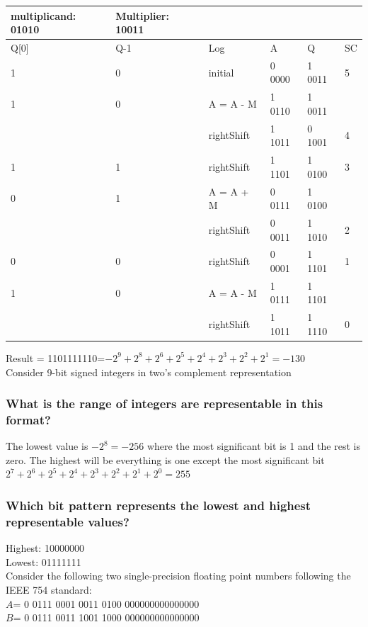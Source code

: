 \documentclass[12pt, a4paper]{article}
\begin{document}
				\begin{table}[h!]
				\begin{tabular}{|l|l|l|l|l|l|}
				multiplicand: 01010 & Multiplier: 10011 \\
				\hline
				Q[0] & Q-1 & Log & A & Q & SC\\
				\hline
				1 & 0 & initial & 0 0000  & 1 0011  & 5\\
				\hline
				1 & 0 & A = A - M &1 0110  & 1 0011 &\\
				\hline
				& &  rightShift & 1 1011  & 0 1001  & 4\\
				\hline
				1 & 1 &  rightShift & 1 1101  & 1 0100  & 3\\
				\hline
				0 & 1 & A = A + M & 0 0111  & 1 0100 &\\
				\hline
				& &  rightShift & 0 0011  & 1 1010  & 2\\
				\hline
				0 & 0 &  rightShift & 0 0001  & 1 1101  & 1\\
				\hline
				1 & 0 & A = A - M &1 0111  & 1 1101 &\\
				\hline
				& &  rightShift & 1 1011  & 1 1110  & 0\\
				\hline
				\end{tabular}
				\end{table}
				Result = 1101111110=$-2^9+2^8+2^6+2^5+2^4+2^3+2^2+2^1=-130$\\[4mm]
				Consider 9-bit signed integers in two’s complement representation
			\subsubsection{What is the range of integers are representable in this format?}
				The lowest value is $-2^8=-256$ where the most significant bit is 1 and the rest is zero. The highest will be everything is one except the most significant bit $2^7+2^6+2^5+2^4+2^3+2^2+2^1+2^0=255$
			\subsubsection{ Which bit pattern represents the lowest and highest representable values?}
				Highest: 10000000\\
				Lowest: 01111111\\[4mm]
			Consider the following two single-precision floating point numbers following the IEEE 754 standard:\\
			$A$= 0 0111 0001 0011 0100 000000000000000\\
			$B$= 0 0111 0011 1001 1000 000000000000000
\end{document}
